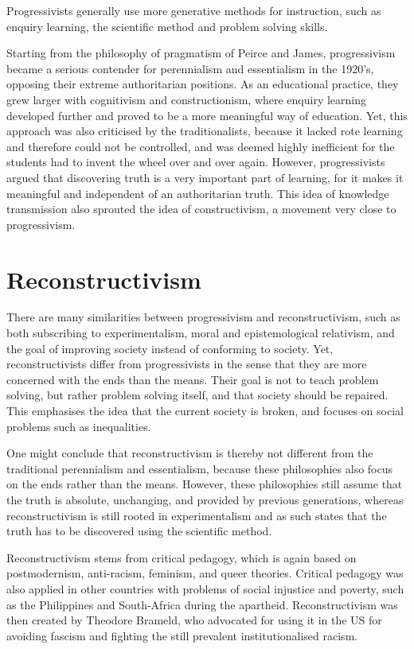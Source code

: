 Progressivists generally use more generative methods for instruction, such as enquiry learning, the scientific method and problem solving skills.

Starting from the philosophy of pragmatism of Peirce and James, progressivism became a serious contender for perennialism and essentialism in the 1920's, opposing their extreme authoritarian positions. As an educational practice, they grew larger with cognitivism and constructionism, where enquiry learning developed further and proved to be a more meaningful way of education. Yet, this approach was also criticised by the traditionalists, because it lacked rote learning and therefore could not be controlled, and was deemed highly inefficient for the students had to invent the wheel over and over again. However, progressivists argued that discovering truth is a very important part of learning, for it makes it meaningful and independent of an authoritarian truth. This idea of knowledge transmission also sprouted the idea of constructivism, a movement very close to progressivism.

\section{Reconstructivism}

There are many similarities between progressivism and reconstructivism, such as both subscribing to experimentalism, moral and epistemological relativism, and the goal of improving society instead of conforming to society. Yet, reconstructivists differ from progressivists in the sense that they are more concerned with the ends than the means. Their goal is not to teach problem solving, but rather problem solving itself, and that society should be repaired. This emphasises the idea that the current society is broken, and focuses on social problems such as inequalities.

One might conclude that reconstructivism is thereby not different from the traditional perennialism and essentialism, because these philosophies also focus on the ends rather than the means. However, these philosophies still assume that the truth is absolute, unchanging, and provided by previous generations, whereas reconstructivism is still rooted in experimentalism and as such states that the truth has to be discovered using the scientific method.

Reconstructivism stems from critical pedagogy, which is again based on postmodernism, anti-racism, feminism, and queer theories. Critical pedagogy was also applied in other countries with problems of social injustice and poverty, such as the Philippines and South-Africa during the apartheid. Reconstructivism was then created by Theodore Brameld, who advocated for using it in the US for avoiding fascism and fighting the still prevalent institutionalised racism.

